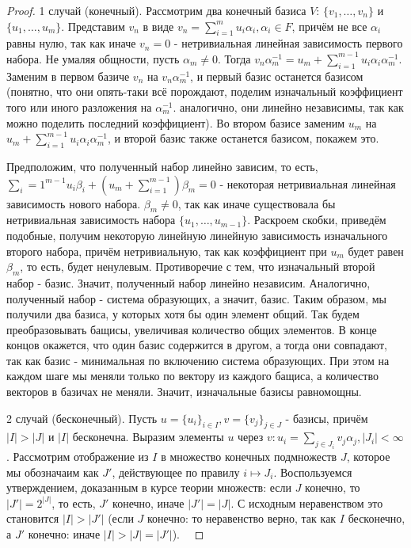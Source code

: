 \documentclass[a4paper,100pt]{article}
\theoremstyle{indented}
\theoremstyle{definition}
\theoremstyle{remark}
\begin{document}
\begin{proof}
    1 случай (конечный). Рассмотрим два конечный базиса $V$: $\{v_1, \dots, v_n\}$ и $\{u_1, \dots , u_m\}$. Представим $v_n$ в виде $v_n=\sum_{i=1}^mu_i\alpha_i, \alpha_i\in F$, причём не все $\alpha_i$ равны нулю, так как иначе $v_n=0$ - нетривиальная линейная зависимость первого набора. Не умаляя общности, пусть $\alpha_m\neq 0$. Тогда $v_n\alpha_m^{-1}=u_m+\sum_{i=1}^{m-1}u_i\alpha_i\alpha_m^{-1}$. Заменим в первом базиче $v_n$ на $v_n\alpha_m^{-1}$, и первый базис останется базисом (понятно, что они опять-таки всё порождают, поделим изначальный коэффициент того или иного разложения на $\alpha_m^{-1}$. аналогично, они линейно независимы, так как можно поделить последний коэффициент). Во втором базисе заменим $u_m$ на $u_m+\sum_{i=1}^{m-1}u_i\alpha_i\alpha_m^{-1}$, и второй базис также останется базисом, покажем это. \ 

    Предположим, что полученный набор линейно зависим, то есть, $\sum_i=1^{m-1}u_i\beta_i+(u_m+\sum_{i=1}^{m-1})\beta_m=0$ - некоторая нетривиальная линейная зависимость нового набора. $\beta_m\neq 0$, так как иначе существовала бы нетривиальная зависимость набора $\{u_1, \dots, u_{m-1}\}$. Раскроем скобки, приведём подобные, получим некоторую линейную линейную зависимость изначального второго набора, причём нетривиальную, так как коэффициент при $u_m$ будет равен $\beta_m$, то есть, будет ненулевым. Противоречие с тем, что изначальный второй набор - базис. Значит, полученный набор линейно независим. Аналогично, полученный набор - система образующих, а значит, базис. Таким образом, мы получили два базиса, у которых хотя бы один элемент общий. Так будем преобразовывать бащисы, увеличивая количество общих элементов. В конце концов окажется, что один базис содержится в другом, а тогда они совпадают, так как базис - минимальная по включению система образующих. При этом на каждом шаге мы меняли только по вектору из каждого бащиса, а количество векторов в базичах не меняли. Значит, изначальные базисы равномощны.\ 

    2 случай (бесконечный). Пусть $u=\{u_i\}_{i\in I}, v=\{v_j\}_{j\in J}$ - базисы, причём $\vert I\vert >\vert J\vert $ и $\vert I\vert$ бесконечна. Выразим элементы $u$ через $v:u_i=\sum_{j\in J_i}v_j\alpha_j, \vert J_i\vert<\infty$. Рассмотрим отображение из $I$ в множество конечных подмножеств $J$, которое мы обозначаим как $J'$, действующее по правилу $i\mapsto J_i$. Воспользуемся утверждением, доказанным в курсе теории множеств: если $J$ конечно, то $\vert J'\vert=2^{\vert J\vert}$, то есть, $J'$ конечно, иначе $\vert J'\vert=\vert J\vert$. С исходным неравенством это становится $\vert I\vert>\vert J'\vert$ (если $J$ конечно: то неравенство верно, так как $I$ бесконечно, а $J'$ конечно: иначе $\vert I\vert > \vert J\vert = \vert J'\vert$). \ 


\end{proof}
\end{document}
